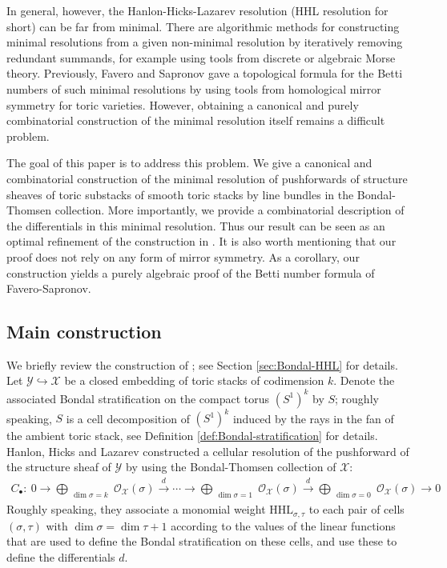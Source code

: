 \documentclass[11pt,reqno]{amsart}
\theoremstyle{definition}
\numberwithin{equation}{section}
\begin{document}
\smallskip

In general, however, the Hanlon-Hicks-Lazarev resolution (HHL resolution for short) can be far from minimal. There are algorithmic methods for constructing minimal resolutions from a given non-minimal resolution by iteratively removing redundant summands, for example using tools from discrete or algebraic Morse theory. Previously, Favero and Sapronov \cite{FS} gave a topological formula for the Betti numbers of such minimal resolutions by using tools from homological mirror symmetry for toric varieties. However, obtaining a canonical and purely combinatorial construction of the minimal resolution itself remains a difficult problem.

\smallskip

The goal of this paper is to address this problem. We give a canonical and combinatorial construction of the minimal resolution of pushforwards of structure sheaves of toric substacks of smooth toric stacks by line bundles in the Bondal-Thomsen collection. More importantly, we provide a combinatorial description of the differentials in this minimal resolution. Thus our result can be seen as an optimal refinement of the construction in \cite{HHL}. It is also worth mentioning that our proof does not rely on any form of mirror symmetry. As a corollary, our construction yields a purely algebraic proof of the Betti number formula of Favero-Sapronov.



\subsection{Main construction}
We briefly review the construction of \cite{HHL}; see Section \ref{sec:Bondal-HHL} for details. Let $\mathcal{Y}\hookrightarrow\mathcal{X}$ be a closed embedding of toric stacks of codimension $k$. Denote the associated Bondal stratification on the compact torus $(S^1)^k$ by $S$; roughly speaking, $S$ is a cell decomposition of $(S^1)^k$ induced by the rays in the fan of the ambient toric stack, see Definition \ref{def:Bondal-stratification} for details. Hanlon, Hicks and Lazarev \cite{HHL} constructed a cellular resolution of the pushforward of the structure sheaf of $\mathcal{Y}$ by using the Bondal-Thomsen collection of $\mathcal{X}$:
    \begin{align}\label{eq:HHL}
        C_{\bullet}:\ 0\rightarrow\bigoplus_{\substack{\dim\sigma=k }} \mathcal{O}_{\mathcal{X}}(\sigma) \xrightarrow{d} \cdots \rightarrow \bigoplus_{\substack{\dim\sigma=1}} \mathcal{O}_{\mathcal{X}}(\sigma) \xrightarrow{d} \bigoplus_{\substack{\dim\sigma=0}} \mathcal{O}_{\mathcal{X}}(\sigma)\rightarrow0
    \end{align}
Roughly speaking, they associate a monomial weight $\mathrm{HHL}_{\sigma,\tau}$ to each pair of cells $(\sigma,\tau)$ with $\dim\sigma=\dim\tau+1$ according to the values of the linear functions that are used to define the Bondal stratification on these cells, and use these to define the differentials $d$.
\end{document}
